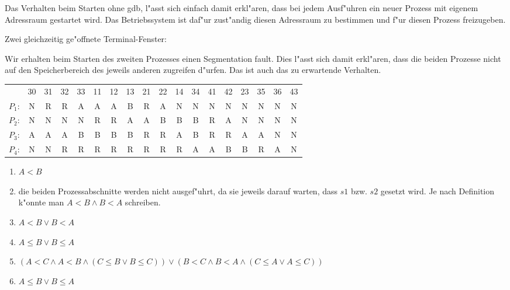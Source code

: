 \documentclass[a4paper,11pt]{article}             %
\begin{document}
Das Verhalten beim Starten ohne gdb, l"asst sich einfach damit erkl"aren, dass
bei jedem Ausf"uhren ein neuer Prozess mit eigenem Adressraum gestartet wird.
Das Betriebssystem ist daf"ur zust"andig diesen Adressraum zu bestimmen und f"ur
diesen Prozess freizugeben. 


Zwei gleichzeitig ge"offnete Terminal-Fenster:

Wir erhalten beim Starten des zweiten Prozesses einen Segmentation
fault. Dies l"asst sich damit erkl"aren, dass die beiden Prozesse nicht auf den
Speicherbereich des jeweils anderen zugreifen d"urfen. Das ist auch das zu erwartende
Verhalten. 



\begin{tabular}{lccccccccccccccccc}
    & 30 & 31 & 32 & 33 & 11 & 12 & 13 & 21 & 22 & 14 & 34 & 41 & 42 & 23 & 35 & 36 &
    43 \\
    $P_1$: & N & R & R & A & A & A & B & R & A & N & N & N & N & N & N & N & N \\
    $P_2$: & N & N & N & N & R & R & A & A & B & B & B & R & A & N & N & N & N \\
    $P_3$: & A & A & A & B & B & B & B & R & R & A & B & R & R & A & A & N & N \\
    $P_4$: & N & N & R & R & R & R & R & R & R & R & A & A & B & B & R & A & N \\
\end{tabular}
    


\begin{enumerate}[label=(\alph*)]
    \item $A < B$
    \item die beiden Prozessabschnitte werden nicht ausgef"uhrt, da sie jeweils
        darauf warten, dass $s1$ bzw. $s2$ gesetzt wird. Je nach Definition
        k"onnte man $A < B \wedge B < A$ schreiben.
    \item $A < B \vee B < A$
    \item $A \leq B \vee B \leq A$
    \item $(A < C \wedge A < B \wedge (C \leq B \vee B \leq C)) \vee (B < C
        \wedge B < A \wedge (C \leq A \vee A \leq C))$
    \item $A \leq B \vee B \leq A$
\end{enumerate}
\end{document}
